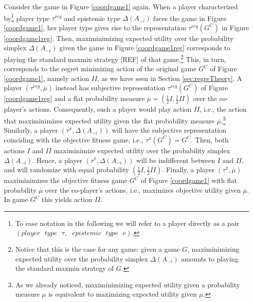\documentclass[fleqn,reqno,11pt]{article}
\begin{document}
\begin{example}
  Consider the game in Figure \ref{coordgame1} again. When a player characterized
  by\footnote{To ease notation in the following we will refer to a player directly as a pair
    $(player \text{ } type \text{ } \tau,\text{ } epistemic\text{ } type \text{ } e)$.} player
  type $ \tau^{reg} $ and epistemic type $ \Delta(A_{-i}) $ faces the game in Figure
  \ref{coordgame1}, her player type gives rise to the representation $\tau^{reg}(G^C)$ in
  Figure \ref{coordgame1reg}. Then, maximinimizing expected utility over the probability
  simplex $ \Delta(A_{-i}) $ given the game in Figure \ref{coordgame1reg} corresponds to
  playing the standard maxmin strategy [REF] of that game.\footnote{Notice that this is the
    case for any game: given a game $G$, maximinimizing expected utility over the probability
    simplex $ \Delta(A_{-i}) $ amounts to playing the standard maxmin strategy of $G$.} This,
  in turn, corresponds to the regret minimizing action of the original game $G^C$ of Figure
  \ref{coordgame1}, namely action $II$, as we have seen in Section \ref{sec:regreTheory}. A
  player $(\tau^{reg},\overline{\mu})$ instead has subjective representation $\tau^{reg}(G^C)$
  of Figure \ref{coordgame1reg} and a flat probability measure
  $\overline{\mu}=(\frac{1}{2}I,\frac{1}{2}II)$ over the co-player's actions. Consequently,
  such a player would play action $II$, i.e., the action that maximinimizes expected utility
  given the flat probability measure $\overline{\mu}$.\footnote{As we already noticed,
    maximinimizing expected utility given a probability measure $\mu$ is equivalent to
    maximizing expected utility given $\mu$.}  Similarly, a player
  $(\tau^{\pi},\Delta(A_{-i}))$ will have the subjective representation coinciding with the
  objective fitness game, i.e., $ \tau^{\pi}(G^C)= G^C $. Then, both actions $I$ and $II$
  maximinimize expected utility over the probability simplex $ \Delta(A_{-i}) $. Hence, a
  player $(\tau^{\pi},\Delta(A_{-i}))$ will be indifferent between $I$ and $II$, and will
  randomize with equal probability $(\frac{1}{2}I,\frac{1}{2}II)$. Finally, a player
  $(\tau^{\pi},\overline{\mu})$ maximinimizes the objective fitness game $G^C$ of Figure
  \ref{coordgame1} with flat probability $\overline{\mu}$ over the co-player's actions, i.e.,
  maximizes objective utility given $\overline{\mu}$. In game $G^C$ this yields action $II$.

\end{example}


\end{document}
